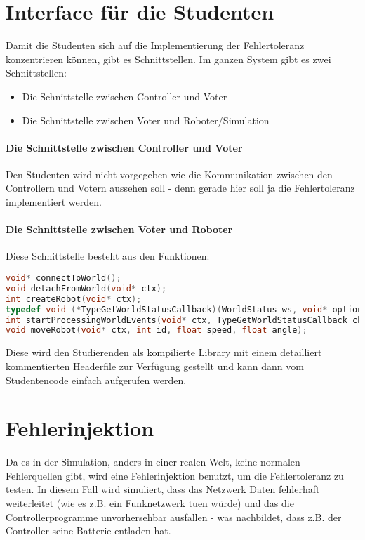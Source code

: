 \documentclass[
    12pt,
    bibliography=totoc,
    ngerman,
    enabledeprecatedfontcommands
]{scrartcl}
\begin{document}
\clearpage
\section{Interface f{\"{u}}r die Studenten}\label{interface}
Damit die Studenten sich auf die Implementierung der Fehlertoleranz konzentrieren k{\"{o}}nnen, gibt es Schnittstellen.
Im ganzen System gibt es zwei Schnittstellen:
\begin{itemize}
\item Die Schnittstelle zwischen Controller und Voter
\item Die Schnittstelle zwischen Voter und Roboter/Simulation
\end{itemize}

\paragraph{Die Schnittstelle zwischen Controller und Voter} Den Studenten wird nicht vorgegeben wie die Kommunikation zwischen den Controllern und Votern aussehen soll - denn gerade hier soll ja die Fehlertoleranz implementiert werden.

\paragraph{Die Schnittstelle zwischen Voter und Roboter} Diese Schnittstelle besteht aus den Funktionen:
\begin{lstlisting}[frame=single, language=c] 
void* connectToWorld();
void detachFromWorld(void* ctx);
int createRobot(void* ctx);
typedef void (*TypeGetWorldStatusCallback)(WorldStatus ws, void* optional);
int startProcessingWorldEvents(void* ctx, TypeGetWorldStatusCallback cb, void* optional);
void moveRobot(void* ctx, int id, float speed, float angle);
\end{lstlisting}

Diese wird den Studierenden als kompilierte Library mit einem detailliert kommentierten Headerfile zur Verf{\"{u}}gung gestellt und kann
dann vom Studentencode einfach aufgerufen werden.

\clearpage
\section{Fehlerinjektion}
Da es in der Simulation, anders in einer realen Welt, keine normalen Fehlerquellen gibt, wird eine Fehlerinjektion benutzt, um die Fehlertoleranz zu testen.
In diesem Fall wird simuliert, dass das Netzwerk Daten fehlerhaft weiterleitet (wie es z.B. ein Funknetzwerk tuen w{\"{u}}rde) und das die Controllerprogramme
unvorhersehbar ausfallen - was nachbildet, dass z.B. der Controller seine Batterie entladen hat.
\end{document}

